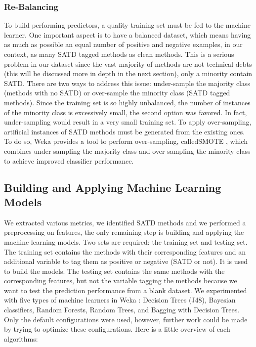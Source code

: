 \subsubsection{Re-Balancing}

To build performing predictors, a quality training set must be fed to the machine learner. One important aspect is to have a balanced dataset, which means having as much as possible an equal number of positive and negative examples, in our context, as many \ac{SATD} tagged methods as clean methods. This is a serious problem in our dataset since the vast majority of methods are not technical debts (this will be discussed more in depth in the next section), only a minority contain \ac{SATD}. There are two ways to address this issue: under-sample the majority class (methods with no \ac{SATD}) or over-sample the minority class (\ac{SATD} tagged methods). Since the training set is so highly unbalanced, the number of instances of the minority class is excessively small, the second option was favored. In fact, under-sampling would result in a very small training set. To apply over-sampling, artificial instances of \ac{SATD} methods must be generated from the existing ones. To do so, Weka provides a tool to perform over-sampling, called\ac{SMOTE} \citep{chawla2002smote}, which combines under-sampling the majority class and over-sampling the minority class to achieve improved classifier performance.

\subsection{Building and Applying Machine Learning Models}

 We extracted various metrics, we identified \ac{SATD} methods and we performed a preprocessing on features, the only remaining step is building and applying the machine learning models. Two sets are required: the training set and testing set. The training set contains the methods with their corresponding features and an additional variable to tag them as positive or negative (\ac{SATD} or not). It is used to build the models. The testing set contains the same methods with the corresponding features, but not the variable tagging the methods because we want to test the prediction performance from a blank dataset. We experimented with five types of machine learners in Weka \citep{hall2009weka}: Decision Trees (J48), Bayesian classifiers, Random Forests, Random Trees, and Bagging with Decision Trees. Only the default configurations were used, however, further work could be made by trying to optimize these configurations. Here is a little overview of each algorithms: \par 

